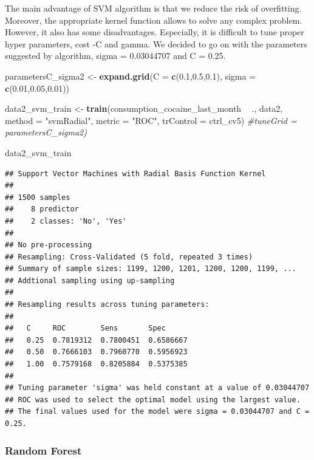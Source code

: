 \documentclass[
]{article}
\newenvironment{Shaded}{\begin{snugshade}}{\end{snugshade}}
\newcommand{\CommentTok}[1]{\textcolor[rgb]{0.56,0.35,0.01}{\textit{#1}}}
\newcommand{\DataTypeTok}[1]{\textcolor[rgb]{0.13,0.29,0.53}{#1}}
\newcommand{\FloatTok}[1]{\textcolor[rgb]{0.00,0.00,0.81}{#1}}
\newcommand{\KeywordTok}[1]{\textcolor[rgb]{0.13,0.29,0.53}{\textbf{#1}}}
\newcommand{\NormalTok}[1]{#1}
\newcommand{\OperatorTok}[1]{\textcolor[rgb]{0.81,0.36,0.00}{\textbf{#1}}}
\newcommand{\StringTok}[1]{\textcolor[rgb]{0.31,0.60,0.02}{#1}}
\begin{document}
The main advantage of SVM algorithm is that we reduce the risk of
overfitting. Moreover, the appropriate kernel function allows to solve
any complex problem. However, it also has some disadvantages.
Especially, it is difficult to tune proper hyper parameters, cost -C and
gamma. We decided to go on with the parameters suggested by algorithm,
sigma = 0.03044707 and C = 0.25.

\begin{Shaded}
\begin{Highlighting}[]
\NormalTok{parametersC_sigma2 <-}\StringTok{ }
\StringTok{  }\KeywordTok{expand.grid}\NormalTok{(}\DataTypeTok{C =} \KeywordTok{c}\NormalTok{(}\FloatTok{0.1}\NormalTok{,}\FloatTok{0.5}\NormalTok{,}\FloatTok{0.1}\NormalTok{),}
              \DataTypeTok{sigma =} \KeywordTok{c}\NormalTok{(}\FloatTok{0.01}\NormalTok{,}\FloatTok{0.05}\NormalTok{,}\FloatTok{0.01}\NormalTok{))}

\NormalTok{data2_svm_train <-}\StringTok{ }
\StringTok{  }\KeywordTok{train}\NormalTok{(consumption_cocaine_last_month }\OperatorTok{~}\StringTok{ }\NormalTok{.,}
\NormalTok{        data2,        }
        \DataTypeTok{method =} \StringTok{"svmRadial"}\NormalTok{,}
        \DataTypeTok{metric =} \StringTok{"ROC"}\NormalTok{,}
        \DataTypeTok{trControl =}\NormalTok{ ctrl_cv5)}
        \CommentTok{#tuneGrid = parametersC_sigma2)}

\NormalTok{data2_svm_train}
\end{Highlighting}
\end{Shaded}

\begin{verbatim}
## Support Vector Machines with Radial Basis Function Kernel 
## 
## 1500 samples
##    8 predictor
##    2 classes: 'No', 'Yes' 
## 
## No pre-processing
## Resampling: Cross-Validated (5 fold, repeated 3 times) 
## Summary of sample sizes: 1199, 1200, 1201, 1200, 1200, 1199, ... 
## Addtional sampling using up-sampling
## 
## Resampling results across tuning parameters:
## 
##   C     ROC        Sens       Spec     
##   0.25  0.7819312  0.7800451  0.6586667
##   0.50  0.7666103  0.7960770  0.5956923
##   1.00  0.7579168  0.8205884  0.5375385
## 
## Tuning parameter 'sigma' was held constant at a value of 0.03044707
## ROC was used to select the optimal model using the largest value.
## The final values used for the model were sigma = 0.03044707 and C = 0.25.
\end{verbatim}

\hypertarget{random-forest}{%
\subsubsection{Random Forest}\label{random-forest}}
\end{document}
